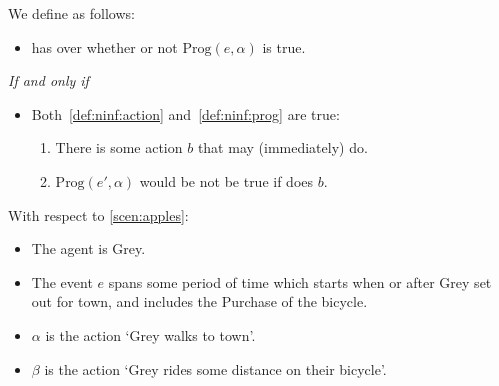 \begin{note}
  We define \ninf{} as follows:

  \begin{definition}[\ninf{2}]
    \label{def:ninf}

    \begin{itemize}
    \item
      \vAgent{} has \ninf{} over whether or not \(\text{Prog}(e, \alpha)\) is true.
    \end{itemize}

    \emph{If and only if}

    \begin{itemize}
    \item
      Both~\ref{def:ninf:action} and~\ref{def:ninf:prog} are true:
      \begin{enumerate}[label=\alph*., ref=(\alph*)]
      \item
        \label{def:ninf:action}
        There is some action \(b\) that \vAgent{} may (immediately) do.
      \item
        \label{def:ninf:prog}
        \(\text{Prog}(e', \alpha)\) would be not be true if \vAgent{} does \(b\).
      \end{enumerate}
    \end{itemize}
    \vspace{-\baselineskip}
  \end{definition}

  With respect to \autoref{scen:apples}:

  \begin{itemize}[noitemsep]
  \item
    The agent is Grey.
  \item
    The event \(e\) spans some period of time which starts when or after Grey set out for town, and includes the Purchase of the bicycle.
  \item
    \(\alpha\) is the action `Grey walks to town'.
  \item
    \(\beta\) is the action `Grey rides some distance on their bicycle'.
  \end{itemize}
\end{note}

